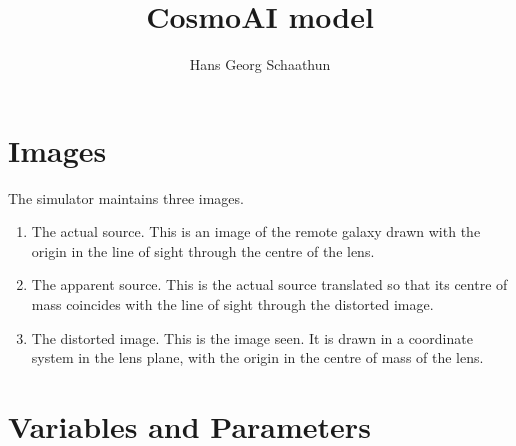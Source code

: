 \documentclass{scrartcl}
\title{CosmoAI model}
\author{Hans Georg Schaathun}
\begin{document}
\maketitle


\section{Images}

The simulator maintains three images.

\begin{enumerate}
   \item The actual source.  This is an image of the remote galaxy drawn with
      the origin in the line of sight through the centre of the lens.
   \item The apparent source.  This is the actual source translated so that
      its centre of mass coincides with the line of sight through the distorted
      image.
   \item The distorted image.  This is the image seen.  It is drawn in a coordinate
      system in the lens plane, with the origin in the centre of mass of the lens.
\end{enumerate}

\section{Variables and Parameters}
\end{document}
